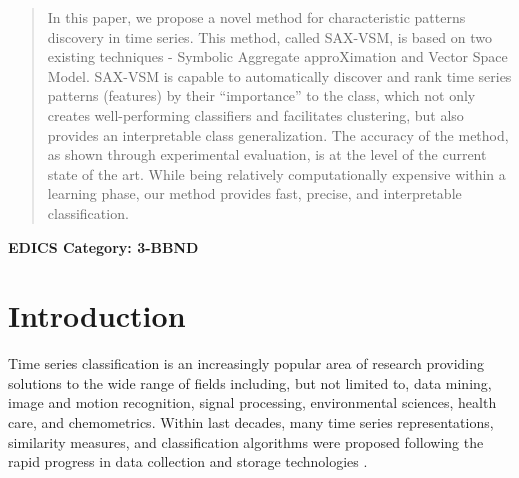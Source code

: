 \documentclass[conference]{IEEEtran}
\begin{document}
\maketitle


\begin{abstract}
In this paper, we propose a novel method for characteristic patterns discovery in 
time series. This method, called SAX-VSM, is based on two existing techniques - 
Symbolic Aggregate approXimation and Vector Space Model. SAX-VSM is capable 
to automatically discover and rank time series patterns (features) by their 
“importance” to the class, which not only creates well-performing classifiers
and facilitates clustering, but also provides an interpretable class generalization. 
The accuracy of the method, as shown through experimental evaluation, is at the 
level of the current state of the art. 
While being relatively computationally expensive within a learning phase, 
our method provides fast, precise, and interpretable classification.
\end{abstract}


 \ifCLASSOPTIONpeerreview
 \begin{center} \bfseries EDICS Category: 3-BBND \end{center}
 \fi
%

\section{Introduction}
%
Time series classification is an increasingly popular area of research providing 
solutions to the wide range of fields including, but not limited to, data mining, 
image and motion recognition, signal processing, environmental sciences, 
health care, and chemometrics. 
Within last decades, many time series representations, similarity measures, 
and classification algorithms were proposed following the rapid
progress in data collection and storage technologies \cite{review}. 
\end{document}
